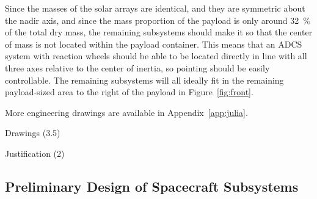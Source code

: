 \documentclass[9pt]{article}
\begin{document}
Since the masses of the solar arrays are identical, and they are symmetric about the nadir axis, and since the mass proportion of the payload is only around \qty{32}{\percent} of the total dry mass, the remaining subsystems should make it so that the center of mass is not located within the payload container.
This means that an ADCS system with reaction wheels should be able to be located directly in line with all three axes relative to the center of inertia, so pointing should be easily controllable.
The remaining subsystems will all ideally fit in the remaining payload-sized area to the right of the payload in Figure~\ref{fig:front}.

More engineering drawings are available in Appendix~\ref{app:julia}.



Drawings (3.5)

Justification (2)


\subsection{Preliminary Design of Spacecraft Subsystems}
\end{document}
